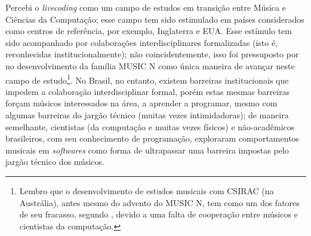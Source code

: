 Percebi o \emph{livecoding} como um campo de estudos em transição entre Música e Ciências da Computação; esse campo tem sido estimulado em países considerados como centros de referência, por exemplo, Inglaterra e EUA. Esse estímulo tem sido acompanhado por colaborações interdisciplinares formalizadas (isto é, reconhecidas institucionalmente); não coincidentemente, isso foi pressuposto por  no desenvolvimento da família MUSIC N como única maneira de avançar neste campo de estudo\footnote{Lembro que o desenvolvimento de estudos musicais com CSIRAC (na Austrália),  antes mesmo do advento do MUSIC N, tem como um dos fatores de seu fracasso, segundo , devido a uma falta de cooperação entre músicos e cientistas da computação.}. No Brasil, no entanto, existem barreiras institucionais que impedem a colaboração interdisciplinar formal, porém estas mesmas barreiras forçam músicos interessados na área, a aprender a programar, mesmo com algumas barreiras do jargão técnico (muitas vezes intimidadoras); de maneira semelhante, cientistas (da computação e muitas vezes físicos) e não-acadêmicos brasileiros, com seu conhecimento de programação, exploraram comportamentos musicais em \emph{softwares} como forma de ultrapassar uma barreira impostas pelo jargão técnico dos músicos.

